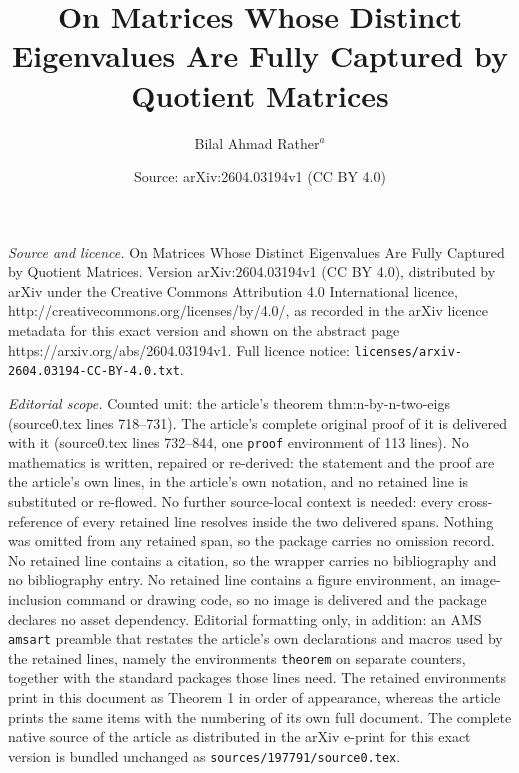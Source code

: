 \documentclass[10pt,a4paper]{amsart}
\title{On Matrices Whose Distinct Eigenvalues Are Fully Captured by Quotient Matrices}
\author{{ Bilal Ahmad Rather$^{a}$}}
\date{Source: arXiv:2604.03194v1 (CC BY 4.0)}
\begin{document}
\maketitle

\noindent\emph{Source and licence.} On Matrices Whose Distinct Eigenvalues Are Fully Captured by Quotient Matrices. Version arXiv:2604.03194v1 (CC BY 4.0), distributed by arXiv under the Creative Commons Attribution 4.0 International licence, http://creativecommons.org/licenses/by/4.0/, as recorded in the arXiv licence metadata for this exact version and shown on the abstract page https://arxiv.org/abs/2604.03194v1. Full licence notice: \texttt{licenses/arxiv-2604.03194-CC-BY-4.0.txt}.\par\smallskip

\noindent\textit{Editorial scope.} Counted unit: the article's theorem thm:n-by-n-two-eigs (source0.tex lines 718--731). The article's complete original proof of it is delivered with it (source0.tex lines 732--844, one \texttt{proof} environment of 113 lines). No mathematics is written, repaired or re-derived: the statement and the proof are the article's own lines, in the article's own notation, and no retained line is substituted or re-flowed.  No further source-local context is needed: every cross-reference of every retained line resolves inside the two delivered spans.  Nothing was omitted from any retained span, so the package carries no omission record.  No retained line contains a citation, so the wrapper carries no bibliography and no bibliography entry.  No retained line contains a figure environment, an image-inclusion command or drawing code, so no image is delivered and the package declares no asset dependency.  Editorial formatting only, in addition: an AMS \texttt{amsart} preamble that restates the article's own declarations and macros used by the retained lines, namely the environments \texttt{theorem} on separate counters, together with the standard packages those lines need.  The retained environments print in this document as Theorem 1 in order of appearance, whereas the article prints the same items with the numbering of its own full document.  The complete native source of the article as distributed in the arXiv e-print for this exact version is bundled unchanged as \texttt{sources/197791/source0.tex}.
\end{document}
